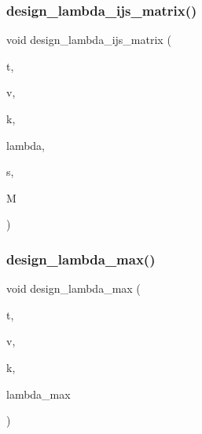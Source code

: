 \mbox{\label{_l_i_b_2_d_i_s_c_r_e_t_a_2design_8_c_a77a457666b8a4a24f1208d257a53f3fb}} 
\subsubsection{\texorpdfstring{design\+\_\+lambda\+\_\+ijs\+\_\+matrix()}{design\_lambda\_ijs\_matrix()}}
{\footnotesize\ttfamily void design\+\_\+lambda\+\_\+ijs\+\_\+matrix (\begin{DoxyParamCaption}\item[{\mbox{\hyperlink{galois_8h_a09fddde158a3a20bd2dcadb609de11dc}{I\+NT}}}]{t,  }\item[{\mbox{\hyperlink{galois_8h_a09fddde158a3a20bd2dcadb609de11dc}{I\+NT}}}]{v,  }\item[{\mbox{\hyperlink{galois_8h_a09fddde158a3a20bd2dcadb609de11dc}{I\+NT}}}]{k,  }\item[{\mbox{\hyperlink{classdiscreta__base}{discreta\+\_\+base}} \&}]{lambda,  }\item[{\mbox{\hyperlink{galois_8h_a09fddde158a3a20bd2dcadb609de11dc}{I\+NT}}}]{s,  }\item[{\mbox{\hyperlink{classmatrix}{matrix}} \&}]{M }\end{DoxyParamCaption})}

\mbox{\label{_l_i_b_2_d_i_s_c_r_e_t_a_2design_8_c_acdf81c1d4f1b0dbacad39f2c0a1190ed}} 
\subsubsection{\texorpdfstring{design\+\_\+lambda\+\_\+max()}{design\_lambda\_max()}}
{\footnotesize\ttfamily void design\+\_\+lambda\+\_\+max (\begin{DoxyParamCaption}\item[{\mbox{\hyperlink{galois_8h_a09fddde158a3a20bd2dcadb609de11dc}{I\+NT}}}]{t,  }\item[{\mbox{\hyperlink{galois_8h_a09fddde158a3a20bd2dcadb609de11dc}{I\+NT}}}]{v,  }\item[{\mbox{\hyperlink{galois_8h_a09fddde158a3a20bd2dcadb609de11dc}{I\+NT}}}]{k,  }\item[{\mbox{\hyperlink{classdiscreta__base}{discreta\+\_\+base}} \&}]{lambda\+\_\+max }\end{DoxyParamCaption})}

